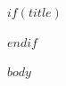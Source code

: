 \documentclass[11pt]{article}
\begin{document}
$if(title)$
\maketitle
$endif$

$body$
\end{document}
